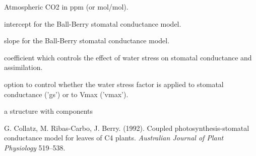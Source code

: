 \documentclass[letterpaper]{book}
\begin{document}
\begin{Arguments}
\begin{ldescription}
\item[\code{Catm}] Atmospheric CO2 in ppm (or
\eqn{\mu}{}mol/mol).

\item[\code{b0}] intercept for the Ball-Berry stomatal
conductance model.

\item[\code{b1}] slope for the Ball-Berry stomatal conductance
model.

\item[\code{StomWS}] coefficient which controls the effect of
water stress on stomatal conductance and assimilation.

\item[\code{ws}] option to control whether the water stress
factor is applied to stomatal conductance ('gs') or to
Vmax ('vmax').
\end{ldescription}
\end{Arguments}
%
\begin{Value}
a  structure with components
\end{Value}
%
\begin{References}\relax
G. Collatz, M. Ribas-Carbo, J. Berry. (1992).  Coupled
photosynthesis-stomatal conductance model for leaves of C4
plants. \emph{Australian Journal of Plant Physiology}
519--538.
\end{References}
%
\begin{SeeAlso}\relax
{}
\end{SeeAlso}
%
\end{document}
